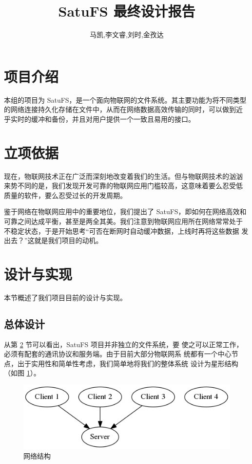 \documentclass{ctexart}
\begin{document}
\title{SatuFS 最终设计报告}
\author{马凯,李文睿,刘时,金孜达}
\date{}
\maketitle

\section{项目介绍}
\label{sec:intro}

本组的项目为 SatuFS，是一个面向物联网的文件系统。其主要功能为将不同类型
的网络连接持久化存储在文件中，从而在网络数据高效传输的同时，可以做到近
乎实时的缓冲和备份，并且对用户提供一个一致且易用的接口。

\section{立项依据}
\label{sec:background}

现在，物联网技术正在广泛而深刻地改变着我们的生活。但与物联网技术的汹汹
来势不同的是，我们发现开发可靠的物联网应用门槛较高，这意味着要么忍受低
质量的软件，要么忍受过长的开发周期。

鉴于网络在物联网应用中的重要地位，我们提出了 SatuFS，即如何在网络高效和
可靠之间达成平衡，甚至是两全其美。我们注意到物联网应用所在网络常常处于
不稳定状态，于是开始思考“可否在断网时自动缓冲数据，上线时再将这些数据
发出去？”这就是我们项目的动机。

\section{设计与实现}
\label{sec:arch}

本节概述了我们项目目前的设计与实现。

\subsection{总体设计}
\label{sec:overall}

从第 \ref{sec:background} 节可以看出，SatuFS 项目并非独立的文件系统，要
使之可以正常工作，必须有配套的通讯协议和服务端。由于目前大部分物联网系
统都有一个中心节点，出于实用性和简单性考虑，我们简单地将我们的整体系统
设计为星形结构（如图 \ref{fig:network}）。

\begin{figure}
  \centering
  \includegraphics[scale=0.4]{design-net-topo.png}
  \caption{网络结构}
  \label{fig:network}
\end{figure}
\end{document}
